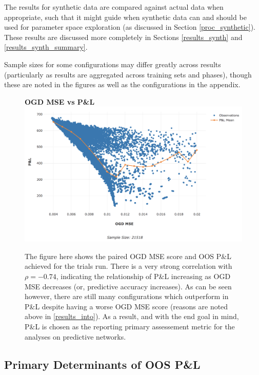 \documentclass[a4paper,11pt,oneside]{article}
\theoremstyle{plain}
\theoremstyle{definition}
\begin{document}
	The results for synthetic data are compared against actual data when appropriate, such that it might guide when synthetic data can and should be used for parameter space exploration (as discussed in Section \ref{proc_synthetic}). These results are discussed more completely in Sections \ref{results_synth} and \ref{results_synth_summary}.\newline

	Sample sizes for some configurations may differ greatly across results (particularly as results are aggregated across training sets and phases), though these are noted in the figures as well as the configurations in the appendix.\newline
	
		\begin{figure}[H]
		\textbf{OGD MSE vs P\&L}
		\centering
		\includegraphics[scale=0.45]{images/results/intro/ogdmse_pl.png}
		\caption[OGD MSE vs OOS P\&L]
		{The figure here shows the paired OGD MSE score and OOS P\&L achieved for the trials run. There is a very strong correlation with $\rho = -0.74$, indicating the relationship of P\&L increasing as OGD MSE decreases (or, predictive accuracy increases). As can be seen however, there are still many configurations which outperform in P\&L despite having a worse OGD MSE score (reasons are noted above in \ref{results_into}). As a result, and with the end goal in mind, P\&L is chosen as the reporting primary assessement metric for the analyses on predictive networks. }
		\label{figure-ogdmse_pl}
	\end{figure}
	
	\newpage
	\subsection{Primary Determinants of OOS P\&L}\label{results_oos_pl}
	
\end{document}
